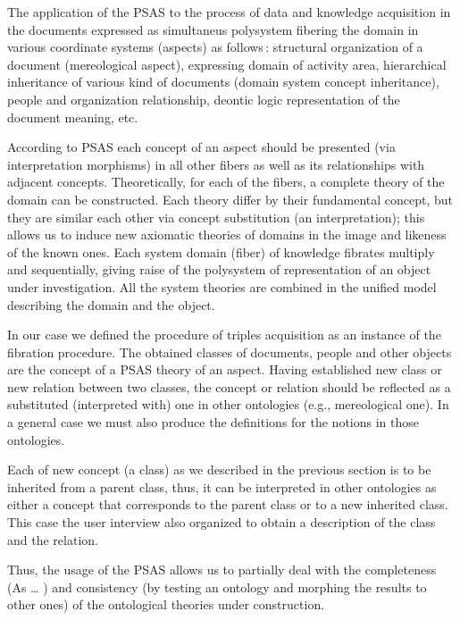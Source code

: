 \documentclass[conference]{IEEEtran}
\begin{document}
The application of the PSAS to the process of data and knowledge acquisition in the documents expressed as simultaneus polysystem fibering the domain in various coordinate systems (aspects) as follows\,: structural organization of a document (mereological aspect), expressing domain of activity area, hierarchical inheritance of various kind of documents (domain system concept inheritance), people and organization relationship, deontic logic representation of the document meaning, etc.

According to PSAS \cite{father} each concept of an aspect should be presented (via interpretation morphisms) in all other fibers as well as its relationships with adjacent concepts. Theoretically, for each of the fibers, a complete theory of the domain can be constructed. Each theory differ by their fundamental concept, but they are similar each other via concept substitution (an interpretation); this allows us to induce new axiomatic theories of domains in the image and likeness of the known ones. Each system domain (fiber) of knowledge fibrates multiply and sequentially, giving raise of the polysystem of representation of an object under investigation. All the system theories are combined in the unified model describing the domain and the object.

In our case we defined the procedure of triples acquisition as an instance of the fibration procedure. The obtained classes of documents, people and other objects are the concept of a PSAS theory of an aspect. Having established new class or new relation between two classes, the concept or relation should be reflected as a substituted (interpreted with) one in other ontologies (e.g., mereological one). In a general case we must also produce the definitions for the notions in those ontologies.

Each of new concept (a class) as we described in the previous section is to be inherited from a parent class, thus, it can be interpreted in other ontologies as either a concept that corresponds to the parent class or to a new inherited class. This case the user interview also organized to obtain a description of the class and the relation.

Thus, the usage of the PSAS allows us to partially deal with the completeness (As \ldots{} \cite{sergey}) and consistency (by testing an ontology and morphing the results to other ones) of the ontological theories under construction.
\end{document}
